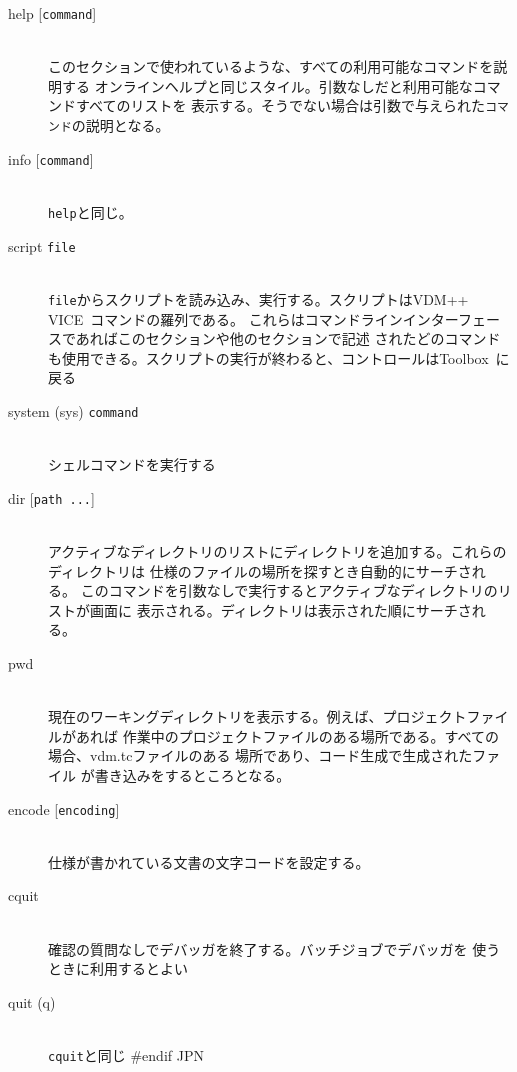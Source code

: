 \documentclass[\pformat,12pt]{article}
\newcommand{\vdmslpp}{VDM-SL}
\newcommand{\Toolbox}{Toolbox}
\newcommand{\vdmslpp}{VDM++}
\newcommand{\Toolbox}{Toolbox}
\renewcommand{\vdmslpp}{VDM++ VICE}
\begin{document}
\begin{description}
\item[help \mbox{[{\tt command}]}] \mbox{}\\
  このセクションで使われているような、すべての利用可能なコマンドを説明する
  オンラインヘルプと同じスタイル。引数なしだと利用可能なコマンドすべてのリストを
  表示する。そうでない場合は引数で与えられた{\tt コマンド}の説明となる。

\item[info \mbox{[{\tt command}]}] \mbox{}\\
  {\tt help}と同じ。

\item[script {\tt file}] \mbox{}\\
  {\tt file}からスクリプトを読み込み、実行する。スクリプトは\vdmslpp\ コマンドの羅列である。
  これらはコマンドラインインターフェースであればこのセクションや他のセクションで記述
  されたどのコマンドも使用できる。スクリプトの実行が終わると、コントロールは\Toolbox\ に戻る

\item[system (sys) {\tt command}]\mbox{}\\
  シェルコマンドを実行する

\item[dir \mbox{[{\tt path ...}]}] \mbox{}\\
  アクティブなディレクトリのリストにディレクトリを追加する。これらのディレクトリは
  仕様のファイルの場所を探すとき自動的にサーチされる。
  このコマンドを引数なしで実行するとアクティブなディレクトリのリストが画面に
  表示される。ディレクトリは表示された順にサーチされる。

\item[pwd]  \mbox{}\\
  現在のワーキングディレクトリを表示する。例えば、プロジェクトファイルがあれば
  作業中のプロジェクトファイルのある場所である。すべての場合、vdm.tcファイルのある
  場所であり、コード生成で生成されたファイル 
  が書き込みをするところとなる。

\item[encode \mbox{[{\tt encoding}]}] \mbox{}\\
  仕様が書かれている文書の文字コードを設定する。

\item[cquit]  \mbox{}\\
  確認の質問なしでデバッガを終了する。バッチジョブでデバッガを
  使うときに利用するとよい

\item[quit (q)] \mbox{}\\
  {\tt cquit}と同じ
#endif JPN

\end{description}
\end{document}
